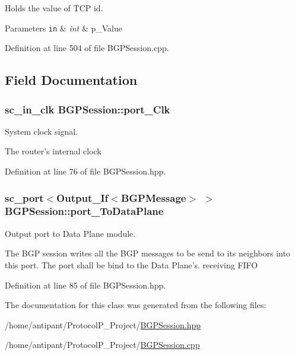 Holds the value of T\-C\-P id. 


\begin{DoxyParams}[1]{Parameters}
\mbox{\tt in}  & {\em int} & p\-\_\-\-Value \\
\hline
\end{DoxyParams}


Definition at line 504 of file B\-G\-P\-Session.\-cpp.



\subsection{Field Documentation}
\hypertarget{classBGPSession_adf7b7904c73267f2e6499ec4ffddee0e}{
\subsubsection[{port\-\_\-\-Clk}]{\setlength{\rightskip}{0pt plus 5cm}sc\-\_\-in\-\_\-clk B\-G\-P\-Session\-::port\-\_\-\-Clk}}\label{classBGPSession_adf7b7904c73267f2e6499ec4ffddee0e}


System clock signal. 

The router's internal clock 

Definition at line 76 of file B\-G\-P\-Session.\-hpp.

\hypertarget{classBGPSession_ad7689f7d5de2710e4d9803de7e274517}{
\subsubsection[{port\-\_\-\-To\-Data\-Plane}]{\setlength{\rightskip}{0pt plus 5cm}sc\-\_\-port$<${\bf Output\-\_\-\-If}$<${\bf B\-G\-P\-Message}$>$ $>$ B\-G\-P\-Session\-::port\-\_\-\-To\-Data\-Plane}}\label{classBGPSession_ad7689f7d5de2710e4d9803de7e274517}


Output port to Data Plane module. 

The B\-G\-P session writes all the B\-G\-P messages to be send to its neighbors into this port. The port shall be bind to the Data Plane's. receiving F\-I\-F\-O 

Definition at line 85 of file B\-G\-P\-Session.\-hpp.



The documentation for this class was generated from the following files\-:\begin{DoxyCompactItemize}
\item 
/home/antipant/\-Protocol\-P\-\_\-\-Project/\hyperlink{BGPSession_8hpp}{B\-G\-P\-Session.\-hpp}\item 
/home/antipant/\-Protocol\-P\-\_\-\-Project/\hyperlink{BGPSession_8cpp}{B\-G\-P\-Session.\-cpp}\end{DoxyCompactItemize}
